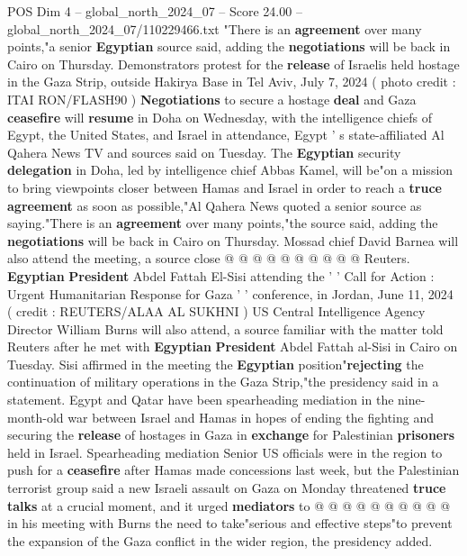 \begin{textsample}{POS Dim 4 – global\_north\_2024\_07 – Score 24.00 – global\_north\_2024\_07/110229466.txt}  \label{ex:f4_pos_176}
"There is an \textbf{agreement} over many points,"a senior \textbf{Egyptian} source said, adding the \textbf{negotiations} will be back in Cairo on Thursday.
Demonstrators protest for the \textbf{release} of Israelis held hostage in the Gaza Strip, outside Hakirya Base in Tel Aviv, July 7, 2024 ( photo credit : ITAI RON/FLASH90 ) \textbf{Negotiations} to secure a hostage \textbf{deal} and Gaza \textbf{ceasefire} will \textbf{resume} in Doha on Wednesday, with the intelligence chiefs of Egypt, the United States, and Israel in attendance, Egypt ' s state-affiliated Al Qahera News TV and sources said on Tuesday.
The \textbf{Egyptian} security \textbf{delegation} in Doha, led by intelligence chief Abbas Kamel, will be"on a mission to bring viewpoints closer between Hamas and Israel in order to reach a \textbf{truce} \textbf{agreement} as soon as possible,"Al Qahera News quoted a senior source as saying."There is an \textbf{agreement} over many points,"the source said, adding the \textbf{negotiations} will be back in Cairo on Thursday.
Mossad chief David Barnea will also attend the meeting, a source close @ @ @ @ @ @ @ @ @ @ Reuters. \textbf{Egyptian} \textbf{President} Abdel Fattah El-Sisi attending the ' ' Call for Action : Urgent Humanitarian Response for Gaza ' ' conference, in Jordan, June 11, 2024 ( credit : REUTERS/ALAA AL SUKHNI ) US Central Intelligence Agency Director William Burns will also attend, a source familiar with the matter told Reuters after he met with \textbf{Egyptian} \textbf{President} Abdel Fattah al-Sisi in Cairo on Tuesday.
Sisi affirmed in the meeting the \textbf{Egyptian} position"\textbf{rejecting} the continuation of military operations in the Gaza Strip,"the presidency said in a statement.
Egypt and Qatar have been spearheading mediation in the nine-month-old war between Israel and Hamas in hopes of ending the fighting and securing the \textbf{release} of hostages in Gaza in \textbf{exchange} for Palestinian \textbf{prisoners} held in Israel.
Spearheading mediation Senior US officials were in the region to push for a \textbf{ceasefire} after Hamas made concessions last week, but the Palestinian terrorist group said a new Israeli assault on Gaza on Monday threatened \textbf{truce} \textbf{talks} at a crucial moment, and it urged \textbf{mediators} to @ @ @ @ @ @ @ @ @ @ in his meeting with Burns the need to take"serious and effective steps"to prevent the expansion of the Gaza conflict in the wider region, the presidency added.

\end{textsample}
